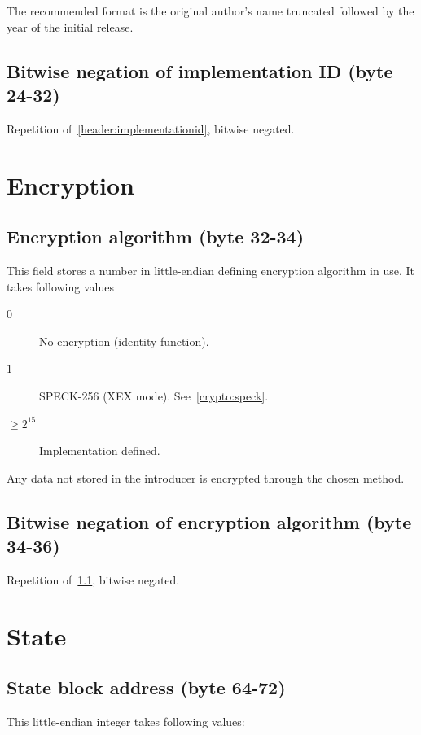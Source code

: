 \documentclass[11pt,a4paper]{report}
\begin{document}
        The recommended format is the original author's name truncated
        followed by the year of the initial release.

        \subsection{Bitwise negation of implementation ID (byte 24-32)}
        Repetition of~\ref{header:implementationid}, bitwise negated.

    \section{Encryption}
        \subsection{Encryption algorithm (byte 32-34)}
        \label{header:encryption}
        This field stores a number in little-endian defining encryption
        algorithm in use. It takes following values

        \begin{description}
            \item [$0$] No encryption (identity function).
            \item [$1$] SPECK-256 (XEX mode).
                See~\ref{crypto:speck}.
            \item [$\geq 2^{15}$] Implementation defined.
        \end{description}

        Any data not stored in the introducer is encrypted through the chosen method.

        \subsection{Bitwise negation of encryption algorithm (byte 34-36)}
        Repetition of~\ref{header:encryption}, bitwise negated.

    \section{State}
        \subsection{State block address (byte 64-72)}
        \label{header:stateblock}
        This little-endian integer takes following values:
\end{document}
